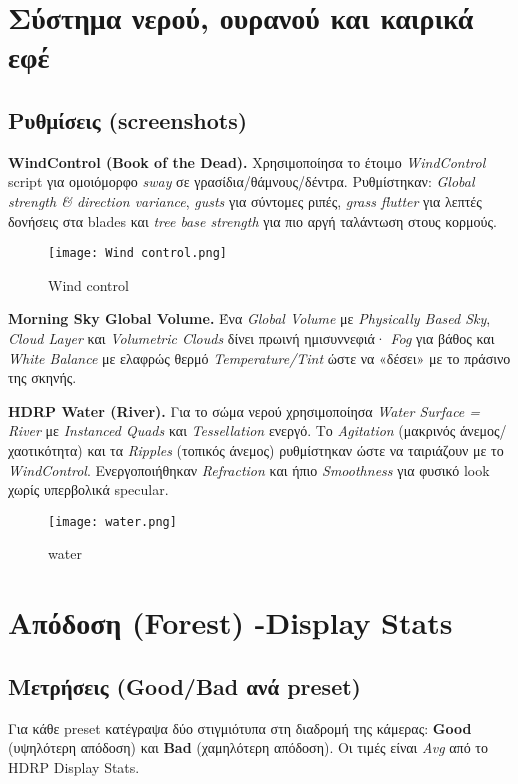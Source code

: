 \section{Σύστημα νερού, ουρανού και καιρικά εφέ}
\subsection*{Ρυθμίσεις (screenshots)}
\textbf{WindControl (Book of the Dead).} Χρησιμοποίησα το έτοιμο \emph{WindControl} script για ομοιόμορφο \emph{sway} σε γρασίδια/θάμνους/δέντρα. Ρυθμίστηκαν: \emph{Global strength \& direction variance}, \emph{gusts} για σύντομες ριπές, \emph{grass flutter} για λεπτές δονήσεις στα blades και \emph{tree base strength} για πιο αργή ταλάντωση στους κορμούς. 

\begin{figure}[H]
    \centering
    \texttt{[image: Wind control.png]}
    \caption{Wind control}
    \label{fig:placeholder}
\end{figure}

\textbf{Morning Sky Global Volume.} Ένα \emph{Global Volume} με \emph{Physically Based Sky}, \emph{Cloud Layer} και \emph{Volumetric Clouds} δίνει πρωινή ημισυννεφιά· \emph{Fog} για βάθος και \emph{White Balance} με ελαφρώς θερμό \emph{Temperature/Tint} ώστε να «δέσει» με το πράσινο της σκηνής.

\textbf{HDRP Water (River).} Για το σώμα νερού χρησιμοποίησα \emph{Water Surface = River} με \emph{Instanced Quads} και \emph{Tessellation} ενεργό. Το \emph{Agitation} (μακρινός άνεμος/χαοτικότητα) και τα \emph{Ripples} (τοπικός άνεμος) ρυθμίστηκαν ώστε να ταιριάζουν με το \emph{WindControl}. Ενεργοποιήθηκαν \emph{Refraction} και ήπιο \emph{Smoothness} για φυσικό look χωρίς υπερβολικά specular.

\begin{figure}[H]
    \centering
    \texttt{[image: water.png]}
    \caption{water}
    \label{fig:placeholder}
\end{figure}





\section{Απόδοση (Forest) -Display Stats}

\subsection*{Μετρήσεις (Good/Bad ανά preset)}
Για κάθε preset κατέγραψα δύο στιγμιότυπα στη διαδρομή της κάμερας: \textbf{Good} (υψηλότερη απόδοση) και \textbf{Bad} (χαμηλότερη απόδοση).
Οι τιμές είναι \emph{Avg} από το HDRP Display Stats.

